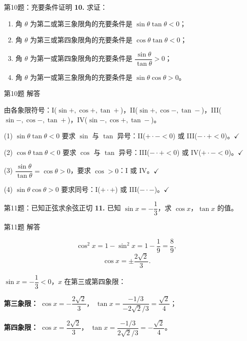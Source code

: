 \documentclass[10pt,aspectratio=169,serif]{beamer}
\begin{document}
\begin{frame}[t]{第10题：充要条件证明}
\textbf{10.} 求证：
\begin{enumerate}
  \item 角 $\theta$ 为第二或第三象限角的充要条件是 $\sin\theta\tan\theta<0$；
  \item 角 $\theta$ 为第三或第四象限角的充要条件是 $\cos\theta\tan\theta<0$；
  \item 角 $\theta$ 为第一或第四象限角的充要条件是 $\dfrac{\sin\theta}{\tan\theta}>0$；
  \item 角 $\theta$ 为第一或第三象限角的充要条件是 $\sin\theta\cos\theta>0$。
\end{enumerate}
\end{frame}

\begin{frame}[t]{第10题 解答}
\begin{tcolorbox}[colback=orange!10,colframe=orange,title=\textbf{证明}]
\small
由各象限符号：I($\sin+, \cos+, \tan+$)，II($\sin+, \cos-, \tan-$)，III($\sin-, \cos-, \tan+$)，IV($\sin-, \cos+, \tan-$)。

(1) $\sin\theta\tan\theta<0$ 要求 $\sin$ 与 $\tan$ 异号：II($+\cdot-<0$) 或 III($-\cdot+<0$)。$\checkmark$

(2) $\cos\theta\tan\theta<0$ 要求 $\cos$ 与 $\tan$ 异号：III($-\cdot+<0$) 或 IV($+\cdot-<0$)。$\checkmark$

(3) $\dfrac{\sin\theta}{\tan\theta}=\cos\theta>0$，要求 $\cos>0$：I 或 IV。$\checkmark$

(4) $\sin\theta\cos\theta>0$ 要求同号：I($+\cdot+$) 或 III($-\cdot-$)。$\checkmark$
\end{tcolorbox}
\end{frame}

\begin{frame}[t]{第11题：已知正弦求余弦正切}
\textbf{11.} 已知 $\sin x=-\dfrac{1}{3}$，求 $\cos x$，$\tan x$ 的值。
\end{frame}

\begin{frame}[t]{第11题 解答}
\begin{tcolorbox}[colback=orange!10,colframe=orange,title=\textbf{解}]
\[
\cos^2 x = 1-\sin^2 x = 1-\frac{1}{9} = \frac{8}{9},
\]
\[
\cos x = \pm\frac{2\sqrt{2}}{3}.
\]

\vspace{0.5em}
$\sin x=-\dfrac{1}{3}<0$，$x$ 在第三或第四象限：

\vspace{0.3em}
\textbf{第三象限：} $\cos x=-\dfrac{2\sqrt{2}}{3}$，
$\tan x=\dfrac{-1/3}{-2\sqrt{2}/3}=\dfrac{\sqrt{2}}{4}$；

\vspace{0.3em}
\textbf{第四象限：} $\cos x=\dfrac{2\sqrt{2}}{3}$，
$\tan x=\dfrac{-1/3}{2\sqrt{2}/3}=-\dfrac{\sqrt{2}}{4}$。
\end{tcolorbox}
\end{frame}
\end{document}
